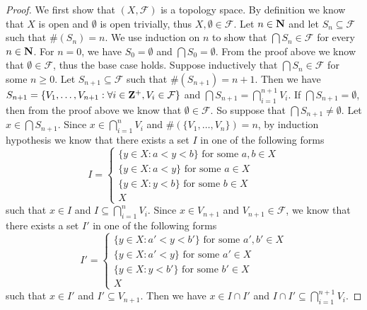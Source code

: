\begin{proof}
    We first show that \((X, \mathcal{F})\) is a topology space.
    By definition we know that \(X\) is open and \(\emptyset\) is open trivially, thus \(X, \emptyset \in \mathcal{F}\).
    Let \(n \in \mathbf{N}\) and let \(S_n \subseteq \mathcal{F}\) such that \(\#(S_n) = n\).
    We use induction on \(n\) to show that \(\bigcap S_n \in \mathcal{F}\) for every \(n \in \mathbf{N}\).
    For \(n = 0\), we have \(S_0 = \emptyset\) and \(\bigcap S_0 = \emptyset\).
    From the proof above we know that \(\emptyset \in \mathcal{F}\), thus the base case holds.
    Suppose inductively that \(\bigcap S_n \in \mathcal{F}\) for some \(n \geq 0\).
    Let \(S_{n + 1} \subseteq \mathcal{F}\) such that \(\#(S_{n + 1}) = n + 1\).
    Then we have \(S_{n + 1} = \{V_1, \dots, V_{n + 1} : \forall i \in \mathbf{Z}^+, V_i \in \mathcal{F}\}\) and \(\bigcap S_{n + 1} = \bigcap_{i = 1}^{n + 1} V_i\).
    If \(\bigcap S_{n + 1} = \emptyset\), then from the proof above we know that \(\emptyset \in \mathcal{F}\).
    So suppose that \(\bigcap S_{n + 1} \neq \emptyset\).
    Let \(x \in \bigcap S_{n + 1}\).
    Since \(x \in \bigcap_{i = 1}^n V_i\) and \(\#(\{V_1, \dots, V_n\}) = n\), by induction hypothesis we know that there exists a set \(I\) in one of the following forms
    \[
        I = \begin{cases}
            \{y \in X : a < y < b\} \text{ for some } a, b \in X \\
            \{y \in X : a < y\} \text{ for some } a \in X        \\
            \{y \in X : y < b\} \text{ for some } b \in X        \\
            X
        \end{cases}
    \]
    such that \(x \in I\) and \(I \subseteq \bigcap_{i = 1}^n V_i\).
    Since \(x \in V_{n + 1}\) and \(V_{n + 1} \in \mathcal{F}\), we know that there exists a set \(I'\) in one of the following forms
    \[
        I' = \begin{cases}
            \{y \in X : a' < y < b'\} \text{ for some } a', b' \in X \\
            \{y \in X : a' < y\} \text{ for some } a' \in X          \\
            \{y \in X : y < b'\} \text{ for some } b' \in X          \\
            X
        \end{cases}
    \]
    such that \(x \in I'\) and \(I' \subseteq V_{n + 1}\).
    Then we have \(x \in I \cap I'\) and \(I \cap I' \subseteq \bigcap_{i = 1}^{n + 1} V_i\).

\end{proof}
